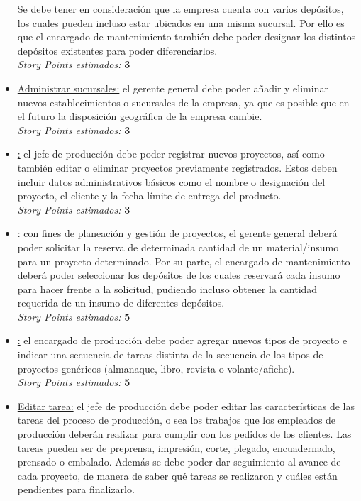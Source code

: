 \documentclass[a4paper, 12pt,twoside]{report}  %
\numberwithin{equation}{subsection} %
\begin{document}
\begin{itemize}
	Se debe tener en consideración que la empresa cuenta con varios depósitos, los cuales pueden incluso estar ubicados en una misma sucursal. Por ello es que el encargado de mantenimiento también debe poder designar los distintos depósitos existentes para poder diferenciarlos.\\
	\textit{Story Points estimados:} \textbf{3}
	\item \underline{Administrar sucursales:} el gerente general debe poder añadir y eliminar nuevos establecimientos o sucursales de la empresa, ya que es posible que en el futuro la disposición geográfica de la empresa cambie.\\
	\textit{Story Points estimados:} \textbf{3}
	\item \underline{:} el jefe de producción debe poder registrar nuevos proyectos, así como también editar o eliminar proyectos previamente registrados. Estos deben incluir datos administrativos básicos como el nombre o designación del proyecto, el cliente y la fecha límite de entrega del producto.\\
	\textit{Story Points estimados:} \textbf{3}
	\item \underline{:} con fines de planeación y gestión de proyectos, el gerente general deberá poder solicitar la reserva de determinada cantidad de un material/insumo para un proyecto determinado. Por su parte, el encargado de mantenimiento deberá poder seleccionar los depósitos de los cuales reservará cada insumo para hacer frente a la solicitud, pudiendo incluso obtener la cantidad requerida de un insumo de diferentes depósitos.\\
	\textit{Story Points estimados:} \textbf{5}
	\item \underline{:} el encargado de producción debe poder agregar nuevos tipos de proyecto e indicar una secuencia de tareas distinta de la secuencia de los tipos de proyectos genéricos (almanaque, libro, revista o volante/afiche).\\
	\textit{Story Points estimados:} \textbf{5}
	\item \underline{Editar tarea:} el jefe de producción debe poder editar las características de las tareas del proceso de producción, o sea los trabajos que los empleados de producción deberán realizar para cumplir con los pedidos de los clientes. Las tareas pueden ser de preprensa, impresión, corte, plegado, encuadernado, prensado o embalado. Además se debe poder dar seguimiento al avance de cada proyecto, de manera de saber qué tareas se realizaron y cuáles están pendientes para finalizarlo.\\

\end{itemize}
\end{document}
